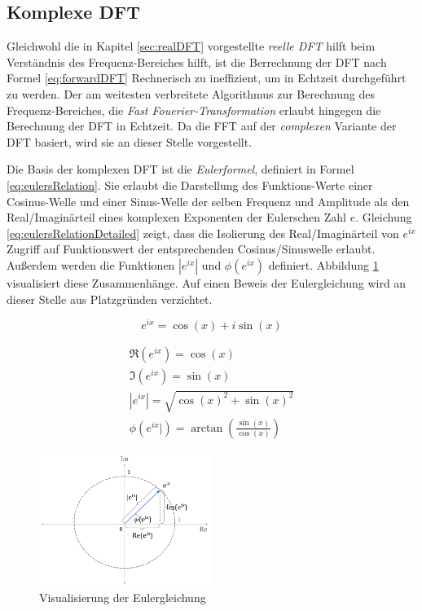 \subsection{Komplexe DFT}
\label{sec:comDFT}

Gleichwohl die in Kapitel \ref{sec:realDFT} vorgestellte \emph{reelle DFT} hilft beim Verständnis des Frequenz-Bereiches hilft, ist die Berrechnung der DFT nach Formel \ref{eq:forwardDFT} Rechnerisch zu ineffizient, um in Echtzeit durchgeführt zu werden. Der am weitesten verbreitete Algorithmus zur Berechnung des Frequenz-Bereiches, die \emph{Fast Fouerier-Transformation} erlaubt hingegen die Berechnung der DFT in Echtzeit. Da die FFT auf der \emph{complexen} Variante der DFT basiert, wird sie an dieser Stelle vorgestellt. \cite[S. 225]{dspGuide}

Die Basis der komplexen DFT ist die \emph{Eulerformel}, definiert in Formel \ref{eq:eulersRelation}. Sie erlaubt die Darstellung des Funktions-Werte einer Cosinus-Welle und einer Sinus-Welle der selben Frequenz und Amplitude als den Real/Imaginärteil eines komplexen Exponenten der Eulerschen Zahl $e$. Gleichung \ref{eq:eulersRelationDetailed} zeigt, dass die Isolierung des Real/Imaginärteil von $e^{ix}$ Zugriff auf Funktionswert der entsprechenden Cosinus/Sinuswelle erlaubt. Außerdem werden die Funktionen $|e^{ix}|$ und $\phi(e^{ix})$ definiert. Abbildung \ref{img:eulersRelation} visualisiert diese Zusammenhänge. Auf einen Beweis der Eulergleichung wird an dieser Stelle aus Platzgründen verzichtet. \cite[S. 569]{dspGuide}

\begin{equation}
e^{ix} = \cos(x) + i\sin(x)
\label{eq:eulersRelation}
\end{equation}

\begin{equation}
\begin{gathered}
\Re(e^{ix}) = \cos(x) \\
\Im(e^{ix}) = \sin(x)  \\
|e^{ix}| = \sqrt{\cos(x)^2 + \sin(x)^2} \\
\phi (e^{ix}|) = \arctan (\frac{\sin(x)}{\cos(x)})
\end{gathered}
\label{eq:eulersRelationDetailed}
\end{equation}

\begin{figure}[h]
	\centering
	\includegraphics[width=0.5\textwidth]{bilder/eulersRelation02.png}
	\caption{Visualisierung der Eulergleichung}
	\label{img:eulersRelation}
\end{figure}


